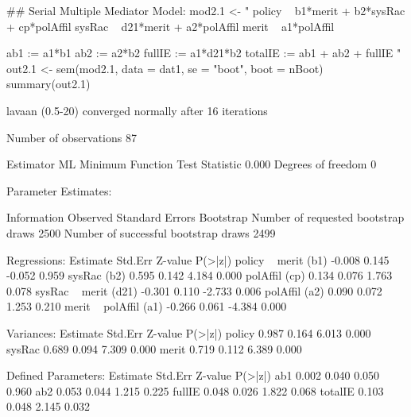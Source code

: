 \begin{Schunk}
\begin{Sinput}
 ## Serial Multiple Mediator Model:
 mod2.1 <- "
 policy ~ b1*merit + b2*sysRac + cp*polAffil
 sysRac ~ d21*merit + a2*polAffil
 merit ~ a1*polAffil
 
 ab1 := a1*b1
 ab2 := a2*b2
 fullIE := a1*d21*b2
 totalIE := ab1 + ab2 + fullIE 
 "
 out2.1 <- 
     sem(mod2.1, data = dat1, se = "boot", boot = nBoot)
 summary(out2.1)
\end{Sinput}
\begin{Soutput}
lavaan (0.5-20) converged normally after  16 iterations

  Number of observations                            87

  Estimator                                         ML
  Minimum Function Test Statistic                0.000
  Degrees of freedom                                 0

Parameter Estimates:

  Information                                 Observed
  Standard Errors                            Bootstrap
  Number of requested bootstrap draws             2500
  Number of successful bootstrap draws            2499

Regressions:
                   Estimate  Std.Err  Z-value  P(>|z|)
  policy ~                                            
    merit     (b1)   -0.008    0.145   -0.052    0.959
    sysRac    (b2)    0.595    0.142    4.184    0.000
    polAffil  (cp)    0.134    0.076    1.763    0.078
  sysRac ~                                            
    merit    (d21)   -0.301    0.110   -2.733    0.006
    polAffil  (a2)    0.090    0.072    1.253    0.210
  merit ~                                             
    polAffil  (a1)   -0.266    0.061   -4.384    0.000

Variances:
                   Estimate  Std.Err  Z-value  P(>|z|)
    policy            0.987    0.164    6.013    0.000
    sysRac            0.689    0.094    7.309    0.000
    merit             0.719    0.112    6.389    0.000

Defined Parameters:
                   Estimate  Std.Err  Z-value  P(>|z|)
    ab1               0.002    0.040    0.050    0.960
    ab2               0.053    0.044    1.215    0.225
    fullIE            0.048    0.026    1.822    0.068
    totalIE           0.103    0.048    2.145    0.032
\end{Soutput}
\end{Schunk}
